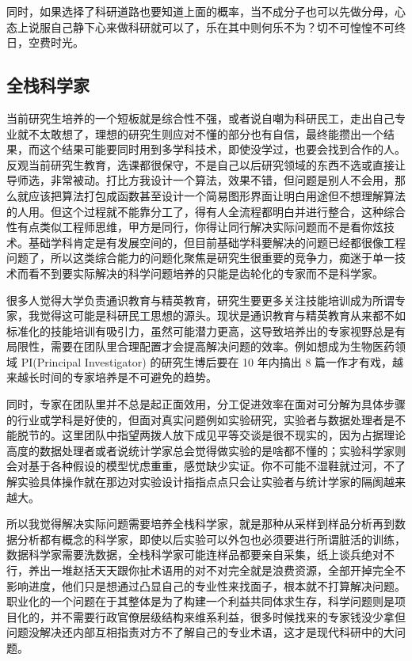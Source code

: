 \documentclass[]{tufte-book}
\begin{document}
同时，如果选择了科研道路也要知道上面的概率，当不成分子也可以先做分母，心态上说服自己静下心来做科研就可以了，乐在其中则何乐不为？切不可惶惶不可终日，空费时光。

\hypertarget{ux5168ux6808ux79d1ux5b66ux5bb6}{%
\subsection{全栈科学家}\label{ux5168ux6808ux79d1ux5b66ux5bb6}}

当前研究生培养的一个短板就是综合性不强，或者说自嘲为科研民工，走出自己专业就不太敢想了，理想的研究生则应对不懂的部分也有自信，最终能攒出一个结果，而这个结果可能要同时用到多学科技术，即使没学过，也要会找到合作的人。反观当前研究生教育，选课都很保守，不是自己以后研究领域的东西不选或直接让导师选，非常被动。打比方我设计一个算法，效果不错，但问题是别人不会用，那么就应该把算法打包成函数甚至设计一个简易图形界面让明白用途但不想理解算法的人用。但这个过程就不能靠分工了，得有人全流程都明白并进行整合，这种综合性有点类似工程师思维，甲方是同行，你得让同行解决实际问题而不是看你炫技术。基础学科肯定是有发展空间的，但目前基础学科要解决的问题已经都很像工程问题了，所以这类综合能力的问题化聚焦是研究生很重要的竞争力，痴迷于单一技术而看不到要实际解决的科学问题培养的只能是齿轮化的专家而不是科学家。

很多人觉得大学负责通识教育与精英教育，研究生要更多关注技能培训成为所谓专家，我觉得这可能是科研民工思想的源头。现状是通识教育与精英教育从来都不如标准化的技能培训有吸引力，虽然可能潜力更高，这导致培养出的专家视野总是有局限性，需要在团队里合理配置才会提高解决问题的效率。例如想成为生物医药领域 PI(Principal Investigator) 的研究生博后要在 10 年内搞出 8 篇一作才有戏，越来越长时间的专家培养是不可避免的趋势。

同时，专家在团队里并不总是起正面效用，分工促进效率在面对可分解为具体步骤的行业或学科是好使的，但面对真实问题例如实验研究，实验者与数据处理者是不能脱节的。这里团队中指望两拨人放下成见平等交谈是很不现实的，因为占据理论高度的数据处理者或者说统计学家总会觉得做实验的是啥都不懂的；实验科学家则会对基于各种假设的模型忧虑重重，感觉缺少实证。你不可能不湿鞋就过河，不了解实验具体操作就在那边对实验设计指指点点只会让实验者与统计学家的隔阂越来越大。

所以我觉得解决实际问题需要培养全栈科学家，就是那种从采样到样品分析再到数据分析都有概念的科学家，即使以后实验可以外包也必须要进行所谓脏活的训练，数据科学家需要洗数据，全栈科学家可能连样品都要亲自采集，纸上谈兵绝对不行，养出一堆赵括天天跟你扯术语用的对不对完全就是浪费资源，全部开掉完全不影响进度，他们只是想通过凸显自己的专业性来找面子，根本就不打算解决问题。职业化的一个问题在于其整体是为了构建一个利益共同体求生存，科学问题则是项目化的，并不需要行政官僚层级结构来维系利益，很多时候找来的专家钱没少拿但问题没解决还内部互相指责对方不了解自己的专业术语，这才是现代科研中的大问题。
\end{document}
